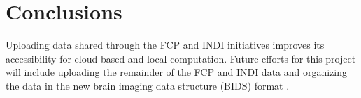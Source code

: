 \documentclass[twocolumn]{bmcart}%
\begin{document}
\section{Conclusions}\label{conclusions}

Uploading data shared through the FCP and INDI initiatives improves its
accessibility for cloud-based and local computation. Future efforts for
this project will include uploading the remainder of the FCP and INDI
data and organizing the data in the new brain imaging data structure
(BIDS) format \cite{Gorgolewski2015}.

\end{document}
